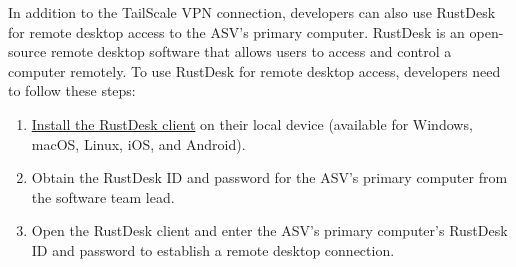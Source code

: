 In addition to the TailScale VPN connection, developers can also use RustDesk for remote desktop access to the ASV's primary computer.
RustDesk is an open-source remote desktop software that allows users to access and control a computer remotely.
To use RustDesk for remote desktop access, developers need to follow these steps:

\begin{enumerate}
    \item \href{https://rustdesk.com/}{Install the RustDesk client} on their local device (available for Windows, macOS, Linux, iOS, and Android).
    \item Obtain the RustDesk ID and password for the ASV's primary computer from the software team lead.
    \item Open the RustDesk client and enter the ASV's primary computer's RustDesk ID and password to establish a remote desktop connection.
\end{enumerate}